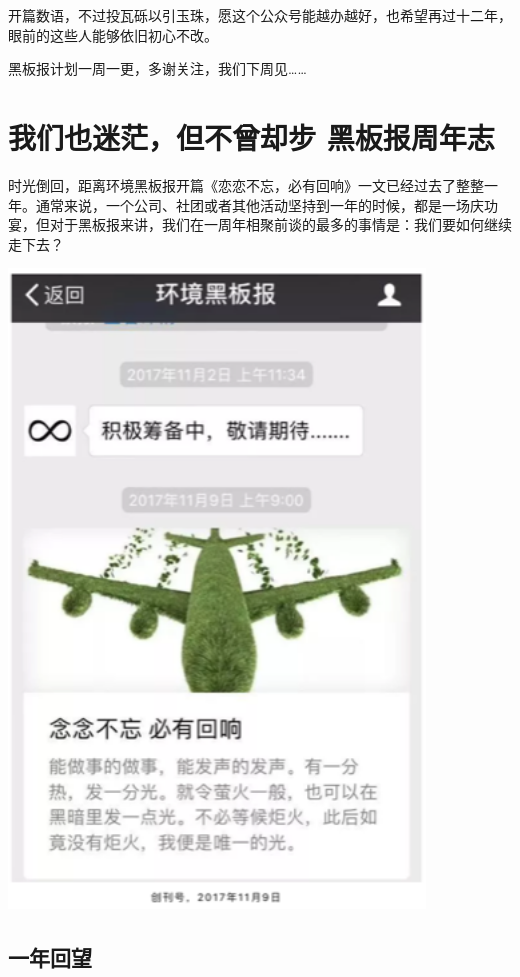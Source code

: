 \documentclass[
]{book}
\begin{document}
开篇数语，不过投瓦砾以引玉珠，愿这个公众号能越办越好，也希望再过十二年，眼前的这些人能够依旧初心不改。

黑板报计划一周一更，多谢关注，我们下周见\ldots\ldots{}

\hypertarget{ux6211ux4eecux4e5fux8ff7ux832bux4f46ux4e0dux66feux5374ux6b65-ux9ed1ux677fux62a5ux5468ux5e74ux5fd7}{%
\section{我们也迷茫，但不曾却步 \textbar{} 黑板报周年志}\label{ux6211ux4eecux4e5fux8ff7ux832bux4f46ux4e0dux66feux5374ux6b65-ux9ed1ux677fux62a5ux5468ux5e74ux5fd7}}

时光倒回，距离环境黑板报开篇《恋恋不忘，必有回响》一文已经过去了整整一年。通常来说，一个公司、社团或者其他活动坚持到一年的时候，都是一场庆功宴，但对于黑板报来讲，我们在一周年相聚前谈的最多的事情是：我们要如何继续走下去？

\includegraphics[width=4.35in]{images/oneyear1}

\hypertarget{ux4e00ux5e74ux56deux671b}{%
\subsection{一年回望}\label{ux4e00ux5e74ux56deux671b}}
\end{document}
